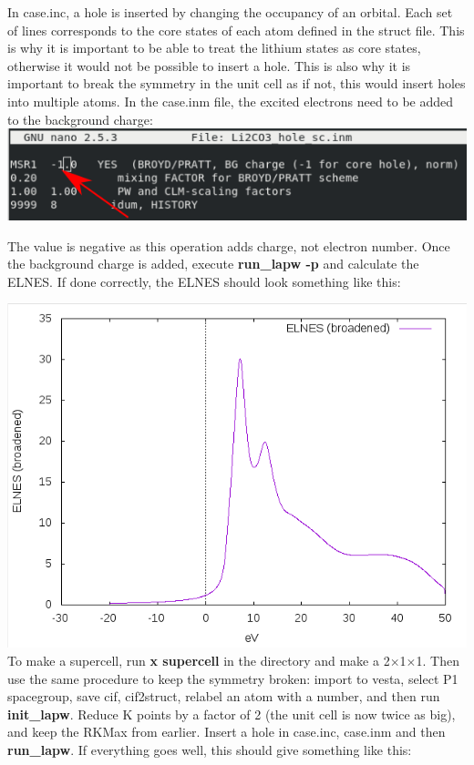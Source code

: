 \documentclass[12pt]{article}
\begin{document}
In case.inc, a hole is inserted by changing the occupancy of an orbital.  Each set of lines corresponds to the core states of each atom defined in the struct file.  This is why it is important to be able to treat the lithium states as core states, otherwise it would not be possible to insert a hole.  This is also why it is important to break the symmetry in the unit cell as if not, this would insert holes into multiple atoms. In the case.inm file, the excited electrons need to be added to the background charge: \\

\includegraphics[scale=0.5]{./images/hole_inm.png}

The value is negative as this operation adds charge, not electron number.  Once the background charge is added, execute \textbf{run\_lapw -p} and calculate the ELNES.  If done correctly, the ELNES should look something like this:  

\includegraphics[scale=0.4]{./images/single_cell_hole_elnes.png}\\

To make a supercell, run \textbf{x supercell} in the directory and make a 2$\times$1$\times$1.  Then use the same procedure to keep the symmetry broken: import to vesta, select P1 spacegroup, save cif, cif2struct, relabel an atom with a number, and then run \textbf{init\_lapw}.  Reduce K points by a factor of 2 (the unit cell is now twice as big), and keep the RKMax from earlier.  Insert a hole in case.inc, case.inm and then \textbf{run\_lapw}.  If everything goes well, this should give something like this: 
\end{document}
